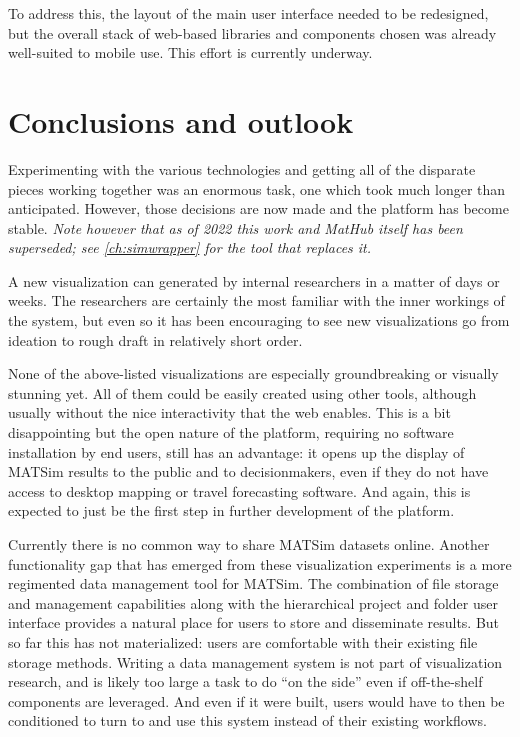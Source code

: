 To address this, the layout of the main user interface needed to be redesigned, but the overall stack of web-based libraries and components chosen was already well-suited to mobile use. This effort is currently underway.

\hypertarget{mathub-conclusions-and-outlook}{%
\section{Conclusions and outlook}\label{conclusions-and-outlook}}

Experimenting with the various technologies and getting all of the disparate pieces working together was an enormous task, one which took much longer than anticipated. However, those decisions are now made and the platform has become stable. \emph{Note however that as of 2022 this work and MatHub itself has been superseded; see \autoref{ch:simwrapper} for the tool that replaces it.}

A new visualization can generated by internal researchers in a matter of days or weeks. The researchers are certainly the most familiar with the inner workings of the system, but even so it has been encouraging to see new visualizations go from ideation to rough draft in relatively short order.

None of the above-listed visualizations are especially groundbreaking or visually stunning yet. All of them could be easily created using other tools, although usually without the nice interactivity that the web enables. This is a bit disappointing but the open nature of the platform, requiring no software installation by end users, still has an advantage: it opens up the display of MATSim results to the public and to decisionmakers, even if they do not have access to desktop mapping or travel forecasting software. And again, this is expected to just be the first step in further development of the platform.

Currently there is no common way to share MATSim datasets online. Another functionality gap that has emerged from these visualization experiments is a more regimented data management tool for MATSim. The combination of file storage and management capabilities along with the hierarchical project and folder user interface provides a natural place for users to store and disseminate results. But so far this has not materialized: users are comfortable with their existing file storage methods. Writing a data management system is not part of visualization research, and is likely too large a task to do ``on the side'' even if off-the-shelf components are leveraged. And even if it were built, users would have to then be conditioned to turn to and use this system instead of their existing workflows.

